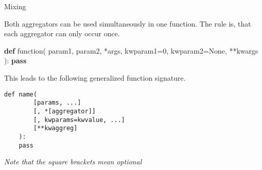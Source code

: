 \documentclass[ignorenonframetext,]{beamer}
\newenvironment{Shaded}{}{}
\newcommand{\KeywordTok}[1]{\textcolor[rgb]{0.00,0.44,0.13}{\textbf{{#1}}}}
\newcommand{\DecValTok}[1]{\textcolor[rgb]{0.25,0.63,0.44}{{#1}}}
\newcommand{\VariableTok}[1]{\textcolor[rgb]{0.10,0.09,0.49}{{#1}}}
\newcommand{\ControlFlowTok}[1]{\textcolor[rgb]{0.00,0.44,0.13}{\textbf{{#1}}}}
\newcommand{\OperatorTok}[1]{\textcolor[rgb]{0.40,0.40,0.40}{{#1}}}
\newcommand{\NormalTok}[1]{{#1}}
\begin{document}
\begin{frame}[fragile]

\begin{block}{Mixing}

Both aggregators can be used simultaneously in one function. The rule
is, that each aggregator can only occur once.

\begin{Shaded}
\begin{Highlighting}[]
\KeywordTok{def} \NormalTok{function(}
        \NormalTok{param1,}
        \NormalTok{param2,}
        \OperatorTok{*}\NormalTok{args,}
        \NormalTok{kwparam1}\OperatorTok{=}\DecValTok{0}\NormalTok{,}
        \NormalTok{kwparam2}\OperatorTok{=}\VariableTok{None}\NormalTok{,}
        \OperatorTok{**}\NormalTok{kwargs}
    \NormalTok{):}
    \ControlFlowTok{pass}
\end{Highlighting}
\end{Shaded}

\end{block}

\end{frame}

\begin{frame}[fragile]

This leads to the following generalized function signature.

\begin{verbatim}
def name(
        [params, ...]
        [, *[aggregator]]
        [, kwparams=kwvalue, ...]
        [**kwaggreg]
    ):
    pass
\end{verbatim}

\emph{Note that the square brackets mean optional}

\end{frame}
\end{document}
